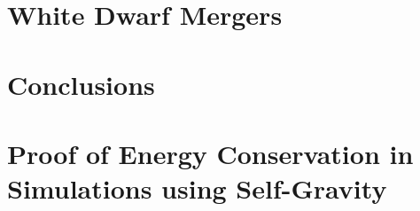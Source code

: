 \documentclass[12pt]{article}
\begin{document}
\newpage
\section{White Dwarf Mergers}
\label{sec:mergers}



\newpage
\section{Conclusions}
\label{sec:conclusion}



\newpage




\newpage

\appendix



\section{Proof of Energy Conservation in Simulations using Self-Gravity}
\label{app:gravity}
\end{document}
